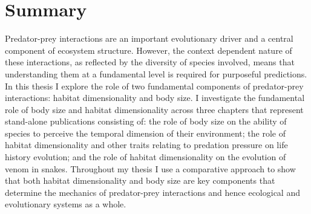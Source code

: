 \chapter*{Summary}

Predator-prey interactions are an important evolutionary driver and a central component of ecosystem structure. However, the context dependent nature of these interactions, as reflected by the diversity of species involved, means that understanding them at a fundamental level is required for purposeful predictions. In this thesis I explore the role of two fundamental components of predator-prey interactions: habitat dimensionality and body size. I investigate the fundamental role of body size and habitat dimensionality across three chapters that represent stand-alone publications consisting of: the role of body size on the ability of species to perceive the temporal dimension of their environment; the role of habitat dimensionality and other traits relating to predation pressure on life history evolution; and the role of habitat dimensionality on the evolution of venom in snakes. Throughout my thesis I use a comparative approach to show that both habitat dimensionality and body size are key components that determine the mechanics of predator-prey interactions and hence ecological and evolutionary systems as a whole.

